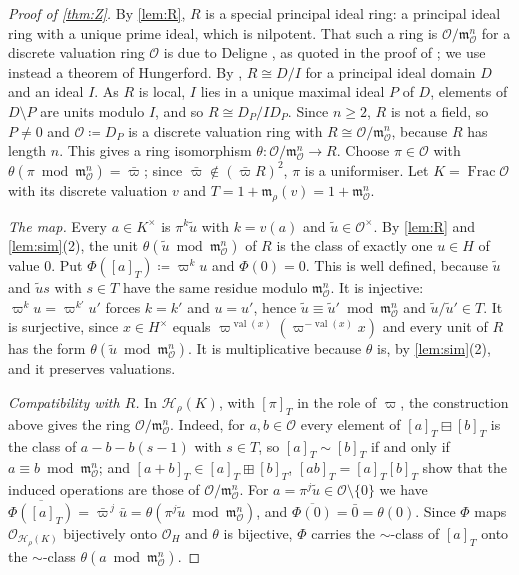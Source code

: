 \documentclass[11pt]{amsart}
\numberwithin{equation}{section}
\newcommand{\hplus}{\boxplus}
\newcommand{\hminus}{\boxminus}
\newcommand{\val}{\operatorname{val}}
\newcommand{\m}{\mathfrak m}
\newcommand{\Hr}{\mathcal H_\rho}
\newcommand{\cls}[1]{[#1]}
\begin{document}
\begin{proof}[Proof of \cref{thm:Z}]
By \cref{lem:R}, $R$ is a special principal ideal ring: a principal ideal ring with a unique prime ideal, which is nilpotent. That such a ring is $\mathcal O/\m_{\mathcal O}^n$ for a discrete valuation ring $\mathcal O$ is due to Deligne \cite[p.~126]{Deligne84}, as quoted in the proof of \cite[Theorem~7.5]{Tolliver16}; we use instead a theorem of Hungerford. By \cite[Corollary~11]{Hungerford68}, $R\cong D/I$ for a principal ideal domain $D$ and an ideal $I$. As $R$ is local, $I$ lies in a unique maximal ideal $P$ of $D$, elements of $D\setminus P$ are units modulo $I$, and so $R\cong D_P/ID_P$. Since $n\ge2$, $R$ is not a field, so $P\ne0$ and $\mathcal O\coloneqq D_P$ is a discrete valuation ring with $R\cong\mathcal O/\m_{\mathcal O}^n$, because $R$ has length $n$. This gives a ring isomorphism $\theta\colon\mathcal O/\m_{\mathcal O}^n\to R$. Choose $\pi\in\mathcal O$ with $\theta(\pi\bmod\m^n_{\mathcal O})=\bar\varpi$; since $\bar\varpi\notin(\bar\varpi R)^2$, $\pi$ is a uniformiser. Let $K=\operatorname{Frac}\mathcal O$ with its discrete valuation $v$ and $T=1+\m_\rho(v)=1+\m^n_{\mathcal O}$.

\emph{The map.} Every $a\in K^\times$ is $\pi^k\tilde u$ with $k=v(a)$ and $\tilde u\in\mathcal O^\times$. By \cref{lem:R} and \cref{lem:sim}(2), the unit $\theta(\tilde u\bmod\m^n_{\mathcal O})$ of $R$ is the class of exactly one $u\in H$ of value $0$. Put $\Phi(\cls a_T)\coloneqq \varpi^ku$ and $\Phi(0)=0$. This is well defined, because $\tilde u$ and $\tilde us$ with $s\in T$ have the same residue modulo $\m^n_{\mathcal O}$. It is injective: $\varpi^ku=\varpi^{k'}u'$ forces $k=k'$ and $u=u'$, hence $\tilde u\equiv\tilde u'\bmod\m^n_{\mathcal O}$ and $\tilde u/\tilde u'\in T$. It is surjective, since $x\in H^\times$ equals $\varpi^{\val(x)}(\varpi^{-\val(x)}x)$ and every unit of $R$ has the form $\theta(\tilde u\bmod\m_{\mathcal O}^n)$. It is multiplicative because $\theta$ is, by \cref{lem:sim}(2), and it preserves valuations.

\emph{Compatibility with $R$.} In $\Hr(K)$, with $\cls\pi_T$ in the role of $\varpi$, the construction above gives the ring $\mathcal O/\m^n_{\mathcal O}$. Indeed, for $a,b\in\mathcal O$ every element of $\cls a_T\hminus\cls b_T$ is the class of $a-b-b(s-1)$ with $s\in T$, so $\cls a_T\sim\cls b_T$ if and only if $a\equiv b\bmod\m^n_{\mathcal O}$; and $\cls{a+b}_T\in\cls a_T\hplus\cls b_T$, $\cls{ab}_T=\cls a_T\cls b_T$ show that the induced operations are those of $\mathcal O/\m^n_{\mathcal O}$. For $a=\pi^j\tilde u\in\mathcal O\setminus\{0\}$ we have $\overline{\Phi(\cls a_T)}=\bar\varpi^{\,j}\bar u=\theta(\pi^j\tilde u\bmod\m^n_{\mathcal O})$, and $\overline{\Phi(0)}=\bar 0=\theta(0)$. Since $\Phi$ maps $\mathcal O_{\Hr(K)}$ bijectively onto $\mathcal O_H$ and $\theta$ is bijective, $\Phi$ carries the $\sim$-class of $\cls a_T$ onto the $\sim$-class $\theta(a\bmod\m^n_{\mathcal O})$.


\end{proof}
\end{document}
